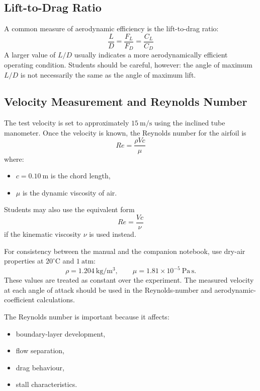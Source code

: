 \documentclass[12pt,letterpaper]{article}
\begin{document}
\subsection{Lift-to-Drag Ratio}
A common measure of aerodynamic efficiency is the lift-to-drag ratio:
\begin{equation}
\frac{L}{D} = \frac{F_L}{F_D} = \frac{C_L}{C_D}
\label{eq:ldratio}
\end{equation}
A larger value of \(L/D\) usually indicates a more aerodynamically efficient operating condition. Students should be careful, however: the angle of maximum \(L/D\) is not necessarily the same as the angle of maximum lift.

\subsection{Velocity Measurement and Reynolds Number}
The test velocity is set to approximately \(15~\text{m/s}\) using the inclined tube manometer. Once the velocity is known, the Reynolds number for the airfoil is
\begin{equation}
Re = \frac{\rho V c}{\mu}
\label{eq:reynolds}
\end{equation}
where:
\begin{itemize}[leftmargin=*]
    \item \(c = 0.10~\text{m}\) is the chord length,
    \item \(\mu\) is the dynamic viscosity of air.
\end{itemize}

Students may also use the equivalent form
\begin{equation}
Re = \frac{Vc}{\nu}
\label{eq:reynolds-kin}
\end{equation}
if the kinematic viscosity \(\nu\) is used instead.

For consistency between the manual and the companion notebook, use dry-air properties at \(20^\circ\mathrm{C}\) and \(1~\mathrm{atm}\):
\[
\rho = 1.204~\mathrm{kg/m^3},
\qquad
\mu = 1.81\times10^{-5}~\mathrm{Pa\,s}.
\]
These values are treated as constant over the experiment. The measured velocity at each angle of attack should be used in the Reynolds-number and aerodynamic-coefficient calculations.

The Reynolds number is important because it affects:
\begin{itemize}[leftmargin=*]
    \item boundary-layer development,
    \item flow separation,
    \item drag behaviour,
    \item stall characteristics.
\end{itemize}
\end{document}
